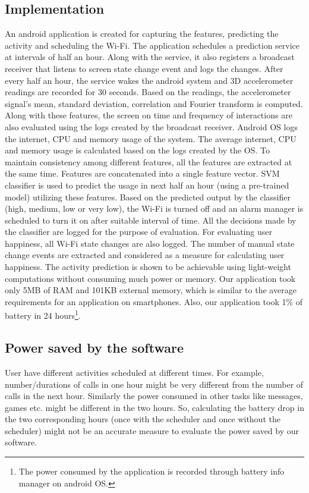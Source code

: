 \subsection{Implementation}
\label{sec:Implementation}
An android application is created for capturing the features, predicting the activity and scheduling the Wi-Fi. The application schedules a prediction service at intervals of half an hour. Along with the service, it also registers a broadcast receiver that listens to screen state change event and logs the changes. After every half an hour, the service wakes the android system and 3D accelerometer readings are recorded for 30 seconds. Based on the readings, the accelerometer signal's mean, standard deviation, correlation and Fourier transform is computed. Along with these features, the screen on time and frequency of interactions are also evaluated using the logs created by the broadcast receiver. Android OS logs the internet, CPU and memory usage of the system. The average internet, CPU and memory usage is calculated based on the logs created by the OS. To maintain consistency among different features, all the features are extracted at the same time. Features are concatenated into a single feature vector. SVM classifier is used to predict the usage in next half an hour (using a pre-trained model) utilizing these features. Based on the predicted output by the classifier (high, medium, low or very low), the Wi-Fi is turned off and an alarm manager is scheduled to turn it on after suitable interval of time. All the decisions made by the classifier are logged for the purpose of evaluation. For evaluating user happiness, all Wi-Fi state changes are also logged. The number of manual state change events are extracted and considered as a measure for calculating user happiness. The activity prediction is shown to be achievable using light-weight computations without consuming much power or memory. Our application took only 5MB of RAM and 101KB external memory, which is similar to the average requirements for an application on smartphones. Also, our application took 1\% of battery in 24 hours\footnote{The power consumed by the application is recorded through battery info manager on android OS.}.

\subsection{Power saved by the software}
\label{powersaved}
User have different activities scheduled at different times. For example, number/durations of calls in one hour might be very different from the number of calls in the next hour. Similarly the power consumed in other tasks like messages, games etc. might be different in the two hours. So, calculating the battery drop in the two corresponding hours (once with the scheduler and once without the scheduler) might not be an accurate measure to evaluate the power saved by our software. 

